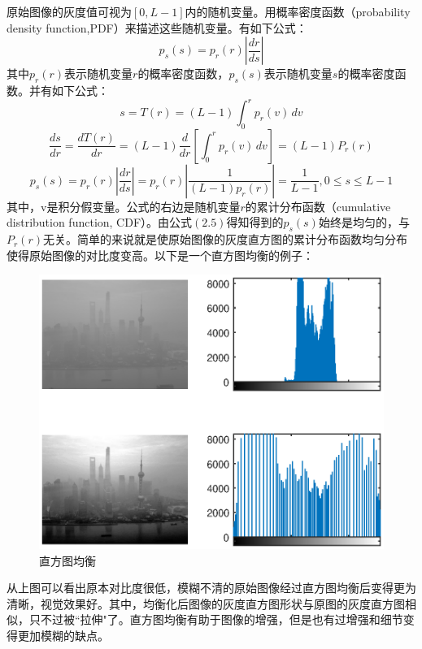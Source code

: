 \documentclass[12pt]{book}
\begin{document}
原始图像的灰度值可视为$[0,L-1]$内的随机变量。用概率密度函数（probability density function,PDF）来描述这些随机变量。有如下公式：
\begin{equation}p_s(s)=p_r(r)|\frac{dr}{ds}|\end{equation}	
其中$p_r(r)$表示随机变量$r$的概率密度函数，$p_s(s)$表示随机变量$s$的概率密度函数。并有如下公式：
\begin{equation}     s=T(r)=(L-1)\int_0^r p_r(v)\,dv    \end{equation}	
\begin{equation}     \frac{ds}{dr}=\frac{dT(r)}{dr}=(L-1)\frac{d}{dr}\left[\int_0^r p_r(v)\,dv 	\right]=(L-1)P_r(r)     \end{equation}
\begin{equation}     p_s(s)=p_r(r) \left| \frac{dr}{ds}\right| =p_r(r) \left| \frac{1}{(L-1)p_r(r)} \right| = \frac{1}{L-1},0 \leq s \leq L-1    \end{equation}
其中，v是积分假变量。公式的右边是随机变量$r$的累计分布函数（cumulative distribution function, CDF）。由公式$(2.5)$得知得到的$p_s(s)$始终是均匀的，与$P_r(r)$无关。简单的来说就是使原始图像的灰度直方图的累计分布函数均匀分布使得原始图像的对比度变高。以下是一个直方图均衡的例子：
			\begin{figure}[!ht]\centering
				\includegraphics[totalheight=60mm]{./figures/histogramExample.eps}
				\caption{直方图均衡\label{histogram}}
			\end{figure}
从上图可以看出原本对比度很低，模糊不清的原始图像经过直方图均衡后变得更为清晰，视觉效果好。其中，均衡化后图像的灰度直方图形状与原图的灰度直方图相似，只不过被“拉伸"了。直方图均衡有助于图像的增强，但是也有过增强和细节变得更加模糊的缺点。
\end{document}
